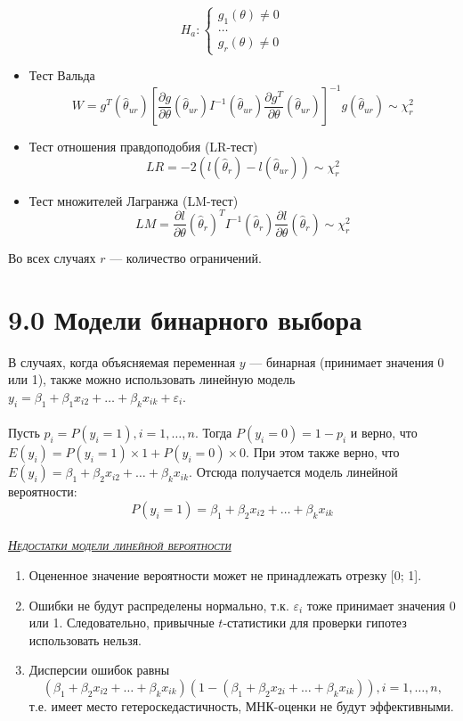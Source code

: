 \documentclass[a0,final]{a0poster}
\DeclareMathOperator{\Var}{Var}
\begin{document}
\begin{multicols}{4}
\begin{multicols}{2}
  \begin{equation*}
       H_a:
\begin{cases}
    g_1(\theta) \ne 0 \\
    \ldots \\
    g_r(\theta) \ne 0
\end{cases}
  \end{equation*}
\end{multicols}
\setlength{\columnseprule}{1pt}
\begin{itemize}
\item Тест Вальда
\[W = g^T(\hat{\theta}_{ur})[\frac{\partial g}{\partial \theta}(\hat{\theta}_{ur})I^{-1}(\hat{\theta}_{ur})\frac{\partial g^T}{\partial \theta}(\hat{\theta}_{ur})]^{-1}g(\hat{\theta}_{ur}) \sim \chi^2_r\]
\item Тест отношения правдоподобия (LR-тест)
\[LR = -2(l(\hat{\theta}_{r})-l(\hat{\theta}_{ur})) \sim \chi^2_r\]
\item Тест множителей Лагранжа (LM-тест)
\[LM = \frac{\partial l}{\partial \theta}(\hat{\theta}_{r})^T I^{-1}(\hat{\theta}_r)\frac{\partial l}{\partial \theta}(\hat{\theta}_r) \sim \chi^2_r\]
\end{itemize}

Во всех случаях $r$ — количество ограничений.

\section*{9.0 Модели бинарного выбора}
В случаях, когда объясняемая переменная $y$ — бинарная (принимает значения 0 или 1), также можно использовать линейную модель \\
$y_i = \beta_1 + \beta_1x_{i2} + \ldots + \beta_kx_{ik} + \varepsilon_i$.\\
\\
Пусть $p_i = P(y_i = 1), i = 1, \ldots, n$. Тогда $P(y_i = 0) = 1 - p_i$ и верно, что $E(y_i) = P(y_i = 1)\times 1 + P(y_i = 0)\times 0$. При этом также верно, что $E(y_i) = \beta_1 + \beta_2x_{i2} + \ldots + \beta_kx_{ik}$. Отсюда получается модель линейной вероятности:
\[P(y_i = 1) = \beta_1 + \beta_2x_{i2} + \ldots + \beta_kx_{ik}\]
\\
\underline{\textsc{\textit{Недостатки модели линейной вероятности}}}
\begin{enumerate}
\item Оцененное значение вероятности может не принадлежать отрезку [0; 1].
\item Ошибки не будут распределены нормально, т.к. $\varepsilon_i$ тоже принимает значения 0 или 1. Следовательно, привычные $t$-статистики для проверки гипотез использовать нельзя.
\item Дисперсии ошибок равны \[(\beta_1 + \beta_2x_{i2} + \ldots + \beta_kx_{ik})(1 - (\beta_1 + \beta_2x_{2i} + \ldots + \beta_kx_{ik})), i = 1, \ldots, n,\]
т.е. имеет место гетероскедастичность, МНК-оценки не будут эффективными.
\end{enumerate}

\end{multicols}
\end{document}
